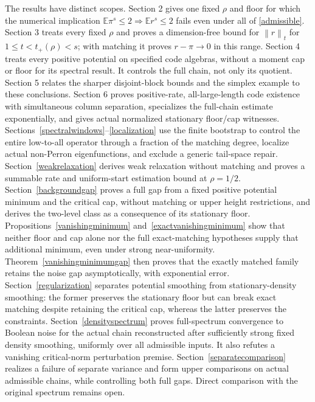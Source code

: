 \documentclass[11pt]{article}
\newcommand{\E}{\mathbb E}
\newcommand{\norm}[1]{\left\|#1\right\|}
\begin{document}
The results have distinct scopes. Section 2 gives one fixed $\rho$ and floor for which the numerical implication $\E\pi^s\leq2\Rightarrow\E r^s\leq2$ fails even under all of \eqref{admissible}. Section 3 treats every fixed $\rho$ and proves a dimension-free bound for $\norm r_t$ for $1\leq t<t_+(\rho)<s$; with matching it proves $r-\pi\to0$ in this range. Section 4 treats every positive potential on specified code algebras, without a moment cap or floor for its spectral result. It controls the full chain, not only its quotient. Section 5 relates the sharper disjoint-block bounds and the simplex example to these conclusions. Section 6 proves positive-rate, all-large-length code existence with simultaneous column separation, specializes the full-chain estimate exponentially, and gives actual normalized stationary floor/cap witnesses. Sections~\ref{spectralwindows}--\ref{localization} use the finite bootstrap to control the entire low-to-all operator through a fraction of the matching degree, localize actual non-Perron eigenfunctions, and exclude a generic tail-space repair. Section~\ref{weakrelaxation} derives weak relaxation without matching and proves a summable rate and uniform-start estimation bound at $\rho=1/2$. Section~\ref{backgroundgap} proves a full gap from a fixed positive potential minimum and the critical cap, without matching or upper height restrictions, and derives the two-level class as a consequence of its stationary floor. Propositions~\ref{vanishingminimum} and~\ref{exactvanishingminimum} show that neither floor and cap alone nor the full exact-matching hypotheses supply that additional minimum, even under strong near-uniformity. Theorem~\ref{vanishingminimumgap} then proves that the exactly matched family retains the noise gap asymptotically, with exponential error. Section~\ref{regularization} separates potential smoothing from stationary-density smoothing: the former preserves the stationary floor but can break exact matching despite retaining the critical cap, whereas the latter preserves the constraints. Section~\ref{densityspectrum} proves full-spectrum convergence to Boolean noise for the actual chain reconstructed after sufficiently strong fixed density smoothing, uniformly over all admissible inputs. It also refutes a vanishing critical-norm perturbation premise. Section~\ref{separatecomparison} realizes a failure of separate variance and form upper comparisons on actual admissible chains, while controlling both full gaps. Direct comparison with the original spectrum remains open.
\end{document}

